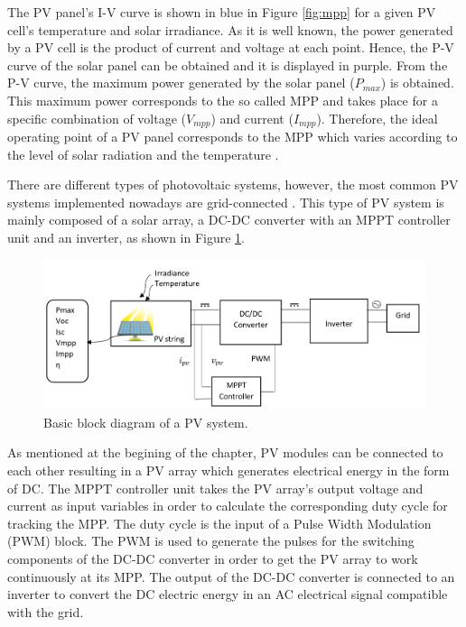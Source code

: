The PV panel's I-V curve is shown in blue in Figure \ref{fig:mpp}
 for a given PV cell's temperature and solar irradiance. As it is well known, the power generated by a PV cell is the product of current and voltage at each point. Hence, the P-V curve of the solar panel can be obtained and it is displayed in purple. From the P-V curve, the maximum power generated by the solar panel ($P_{max}$) is obtained. This maximum power corresponds to the so called MPP and takes place for a specific combination of voltage ($V_{mpp}$) and current ($I_{mpp}$). Therefore, the ideal operating point of a PV panel corresponds to the MPP which varies according to the level of solar radiation and the temperature \cite{handbook}. 

There are different types of photovoltaic systems, however, the most common PV systems implemented nowadays are grid-connected \cite{handbook}. This type of PV system is mainly composed of a solar array, a DC-DC converter with an MPPT controller unit and an inverter, as shown in Figure \ref{fig:PVsystemblocks}. 

\begin{figure}[htbp]
	\includegraphics[width=\linewidth]{../Pictures/PV_system_blocks}
	\caption{Basic block diagram of a PV system.}
	\label{fig:PVsystemblocks}
\end{figure}

As mentioned at the begining of the chapter, PV modules can be connected to each other resulting in a PV array which generates electrical energy in the form of DC. The MPPT controller unit takes the PV array's output voltage and current as input variables in order to calculate the corresponding duty cycle for tracking the MPP. The duty cycle is the input of a Pulse Width Modulation (PWM) block. The PWM is used to generate the pulses for the switching components of the DC-DC converter in order to get the PV array to work continuously at its MPP. The output of the DC-DC converter is connected to an inverter to convert the DC electric energy in an AC electrical signal compatible with the grid.\cite{handbook}